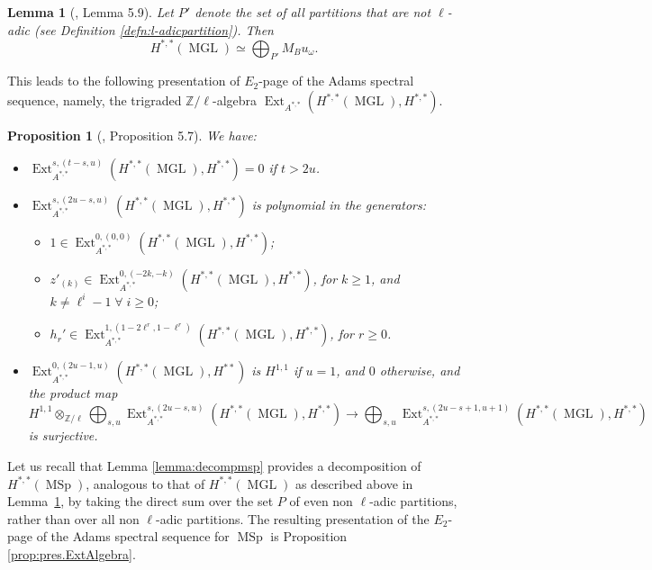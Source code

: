 \documentclass[10pt]{amsart}
\theoremstyle{definition}
\theoremstyle{plain}
\newtheorem{prop}[defn]{Proposition}
\newtheorem{lemma}[defn]{Lemma}
\numberwithin{equation}{section}
\newcommand{\0}{\emptyset}
\newcommand{\Z}{{\mathbb Z}}
\newcommand{\MGL}{{\operatorname{MGL}}}
\newcommand{\MSp}{{\operatorname{MSp}}}
\newcommand{\Ext}{{\operatorname{Ext}}}
\begin{document}
\begin{lemma}[\cite{lev:ellcoh}, Lemma 5.9]
\label{lemma:decompMGL}
Let $P'$ denote the set of all partitions that are not $\ell$-adic (see Definition \ref{defn:l-adicpartition}). Then
    $$H^{*,*}(\MGL) \simeq \bigoplus_{P'}M_B u_\omega.$$
\end{lemma}

This leads to the following presentation of $E_2$-page of the Adams spectral sequence, namely, the trigraded $\Z/\ell$-algebra $\Ext_{A^{*,*}}(H^{*,*}(\MGL),H^{*,*})$.

\begin{prop}[\cite{lev:ellcoh}, Proposition 5.7]
\label{prop:ExtMGL}
We have:
    \begin{itemize}
            \item $\Ext_{A^{*,*}}^{s,(t-s,u)}(H^{*,*}(\MGL),H^{*,*})=0$ if $t>2u$.
            \item $\Ext_{A^{*,*}}^{s,(2u-s,u)}(H^{*,*}(\MGL),H^{*,*})$ is polynomial in the generators:
            \begin{itemize}
                \item $1 \in \Ext_{A^{*,*}}^{0,(0,0)}(H^{*,*}(\MGL),H^{*,*})$;
                \item $z'_{(k)}\in \Ext_{A^{*,*}}^{0,(-2k,-k)}(H^{*,*}(\MGL),H^{*,*})$, for $k\ge 1$, and $k\neq \ell^i-1 \; \forall \; i \ge 0 $;
                \item $h_r' \in \Ext_{A^{*,*}}^{1,(1-2 \ell^r,1-\ell^r)}(H^{*,*}(\MGL),H^{*,*})$, for $r \ge 0$.
            \end{itemize}
            \item $\Ext_{A^{*,*}}^{0,(2u-1,u)}(H^{*,*}(\MGL),H^{**})$ is $H^{1,1}$ if $u=1$, and $0$ otherwise, and the product map
        $$   H^{1,1} \otimes_{\Z/\ell} \bigoplus_{s,u}\Ext_{A^{*,*}}^{s,(2u-s,u)}(H^{*,*}(\MGL),H^{*,*}) \to \bigoplus_{s,u} \Ext_{A^{*,*}}^{s,(2u-s+1,u+1)}(H^{*,*}(\MGL),H^{*,*})$$
        is surjective.
        \end{itemize}
\end{prop}

Let us recall that Lemma \ref{lemma:decompmsp} provides a decomposition of $H^{*,*}(\MSp)$, analogous to that of $H^{*,*}(\MGL)$ as described above in Lemma~\ref{lemma:decompMGL}, by taking the direct sum over the set $P$ of even non $\ell$-adic partitions, rather than over all non $\ell$-adic partitions. The resulting presentation of the $E_2$-page of the Adams spectral sequence for $\MSp$ is Proposition \ref{prop:pres.ExtAlgebra}.
\end{document}
